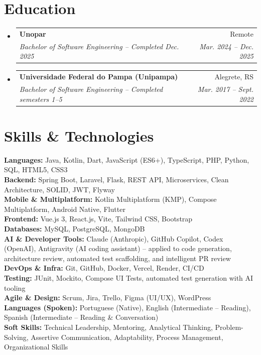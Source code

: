 \documentclass[letterpaper,11pt]{article}
\makeatletter
\newcommand{\resumeSubheading}[4]{
    \vspace{-2pt}\item
    \begin{tabular*}{0.97\textwidth}[t]{l@{\extracolsep{\fill}}r}
    \textbf{#1} & #2 \\
    \textit{\small#3} & \textit{\small #4} \\
    \end{tabular*}\vspace{-7pt}
}
\newcommand{\resumeSubHeadingListStart}{\begin{itemize}[leftmargin=0.15in, label={}]}
\newcommand{\resumeSubHeadingListEnd}{\end{itemize}}
\makeatother
\begin{document}
\section{Education}
\resumeSubHeadingListStart
\resumeSubheading
{Unopar}{Remote}
{Bachelor of Software Engineering -- Completed Dec. 2025}{Mar. 2024 -- Dec. 2025}
\resumeSubheading
{Universidade Federal do Pampa (Unipampa)}{Alegrete, RS}
{Bachelor of Software Engineering -- Completed semesters 1--5}{Mar. 2017 -- Sept. 2022}
\resumeSubHeadingListEnd

\section{Skills \& Technologies}
\begin{itemize}[leftmargin=0.15in, label={}]
\small{\item{
\vspace{1mm}
\textbf{Languages:} Java, Kotlin, Dart, JavaScript (ES6+), TypeScript, PHP, Python, SQL, HTML5, CSS3 \\
\vspace{1mm}
\textbf{Backend:} Spring Boot, Laravel, Flask, REST API, Microservices, Clean Architecture, SOLID, JWT, Flyway \\
\vspace{1mm}
\textbf{Mobile \& Multiplatform:} Kotlin Multiplatform (KMP), Compose Multiplatform, Android Native, Flutter \\
\vspace{1mm}
\textbf{Frontend:} Vue.js 3, React.js, Vite, Tailwind CSS, Bootstrap \\
\vspace{1mm}
\textbf{Databases:} MySQL, PostgreSQL, MongoDB \\
\vspace{1mm}
\textbf{AI \& Developer Tools:} Claude (Anthropic), GitHub Copilot, Codex (OpenAI), Antigravity (AI coding assistant) -- applied to code generation, architecture review, automated test scaffolding, and intelligent PR review \\
\vspace{1mm}
\textbf{DevOps \& Infra:} Git, GitHub, Docker, Vercel, Render, CI/CD \\
\vspace{1mm}
\textbf{Testing:} JUnit, Mockito, Compose UI Tests, automated test generation with AI tooling \\
\vspace{1mm}
\textbf{Agile \& Design:} Scrum, Jira, Trello, Figma (UI/UX), WordPress \\
\vspace{1mm}
\textbf{Languages (Spoken):} Portuguese (Native), English (Intermediate -- Reading), Spanish (Intermediate -- Reading \& Conversation) \\
\vspace{1mm}
\textbf{Soft Skills:} Technical Leadership, Mentoring, Analytical Thinking, Problem-Solving, Assertive Communication, Adaptability, Process Management, Organizational Skills \\
\vspace{1mm}
}}
\end{itemize}
\end{document}
